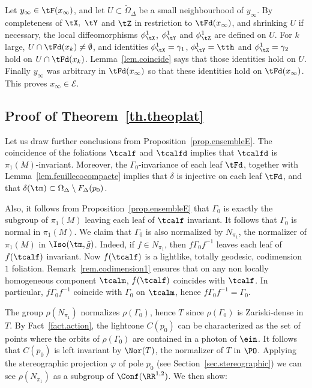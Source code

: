 Let $y_{\infty} \in \tF(x_{\infty})$, and let $U \subset \tilde{\Omega}_{\Delta}$ be a small neighbourhood of $y_{\infty}$. By completeness of $\tX,\ \tY$ and $\tZ$ in restriction to $\tFd(x_{\infty})$, and shrinking $U$ if necessary, the local diffeomorphisms $\phi_{\tX}^1$, $\phi_{\tY}^1$ and $\phi_{\tZ}^1$ are defined on $U$. For $k$ large, $U \cap \tFd(x_k) \not = \emptyset$, and identities $\phi_{\tX}^1=\gamma_1$, $\phi_{\tY}^1=\tth$ and $\phi_{\tZ}^1=\gamma_2$ hold on $U \cap \tFd(x_k)$. Lemma~\ref{lem.coincide} says that those identities hold on $U$. Finally $y_{\infty}$ was arbitrary in $\tFd(x_{\infty})$ so that these identities hold on $\tFd(x_{\infty})$. This proves $x_{\infty} \in {\mathcal E}$.



\subsection{Proof of Theorem~\ref{th.theoplat}}\label{sec.conclusion}
Let us draw further conclusions from Proposition~\ref{prop.ensembleE}. The coincidence of the foliations $\tcalf$ and $\tcalfd$ implies that $\tcalfd$ is $\pi_1(M)$-invariant. Moreover, the $\Gamma_0$-invariance of each leaf $\tFd$, together with Lemma~\ref{lem.feuillecocompacte} implies that $\delta$ is injective on each leaf $\tFd$, and that $\delta(\tm) \subset \Omega_{\Delta} \setminus F_{\Delta}(p_0)$.

Also, it follows from Proposition~\ref{prop.ensembleE} that $\Gamma_0$ is exactly the subgroup of $\pi_1(M)$ leaving each leaf of $\tcalf$ invariant. It follows that $\Gamma_0$ is normal in $\pi_1(M)$. We claim that $\Gamma_0$ is also normalized by $N_{\pi_1}$, the normalizer of $\pi_1(M)$ in $\Iso(\tm,\tilde{g})$. Indeed, if $f \in N_{\pi_1}$, then $f\Gamma_0 f^{-1}$ leaves each leaf of $f(\tcalf)$ invariant. Now $f(\tcalf)$ is a lightlike, totally geodesic, codimension~$1$ foliation. Remark~\ref{rem.codimension1} ensures that on any non locally homogeneous component $\tcalm$, $f(\tcalf)$ coincides with $\tcalf$. In particular, $f\Gamma_0 f^{-1}$ coincide with $\Gamma_0$ on $\tcalm$, hence $f\Gamma_0f^{-1}=\Gamma_0$.


The group $\rho(N_{\pi_1})$ normalizes $\rho(\Gamma_0)$, hence $T$ since $\rho(\Gamma_0)$ is Zariski-dense in $T$. By Fact~\ref{fact.action}, the lightcone $C(p_0)$ can be characterized as the set of points where the orbits of $\rho(\Gamma_0)$ are contained in a photon of $\ein$. It follows that $C(p_0)$ is left invariant by $\Nor(T)$, the normalizer of $T$ in $\PO$. Applying the stereographic projection $\varphi$ of pole $p_0$ (see Section~\ref{sec.stereographic}) we can see $\rho(N_{\pi_1})$ as a subgroup of $\Conf(\RR^{1,2})$. We then show:

